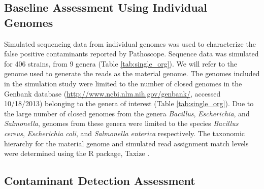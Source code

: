 \documentclass[fleqn,10pt,lineno]{wlpeerj}\usepackage[]{graphicx}\usepackage[]{color}
\begin{document}
\subsection*{Baseline Assessment Using Individual Genomes}
Simulated sequencing data from individual genomes was used to characterize the false positive contaminants reported by Pathoscope. 
Sequence data was simulated for 406 strains, from 9 genera (Table \ref{tab:single_org}).
We will refer to the genome used to generate the reads as the material genome.
The genomes included in the simulation study were limited to the number of closed genomes in the Genbank database (\url{http://www.ncbi.nlm.nih.gov/genbank/}, accessed 10/18/2013) belonging to the genera of interest (Table \ref{tab:single_org}).
Due to the large number of closed genomes from the genera \textit{Bacillus}, \textit{Escherichia}, and \textit{Salmonella}, genomes from these genera were limited to the species \textit{Bacillus cereus}, \textit{Escherichia coli}, and \textit{Salmonella enterica} respectively.
The taxonomic hierarchy for the material genome and simulated read assignment match levels were determined using the R package, Taxize \citep{TaxizeArticle,TaxizeManual}.

\subsection*{Contaminant Detection Assessment} 
\end{document}
